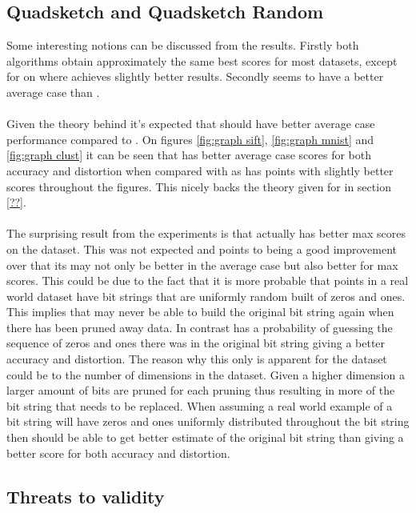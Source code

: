 \subsection{Quadsketch and Quadsketch Random}
Some interesting notions can be discussed from the results. Firstly both algorithms obtain approximately the same best scores for most datasets, except for on \mnist{} where \qsr{} achieves slightly better results. 
Secondly \qsr{} seems to have a better average case than \qs{}. 
\\
\\
Given the theory behind \qsr{} it's expected that \qsr{} should have better average case performance compared to \qs{}. On figures \ref{fig:graph sift}, \ref{fig:graph mnist} and \ref{fig:graph clust} it can be seen that \qsr{} has better average case scores for both accuracy and distortion when compared with \qs{} as \qsr{} has points with slightly better scores throughout the figures. This nicely backs the theory given for \qsr{} in section \ref{??}.
\\
\\
The surprising result from the experiments is that \qsr{} actually has better max scores on the \mnist dataset. This was not expected and points to \qsr{} being a good improvement over \qs{} that its may not only be better in the average case but also better for max scores. This could be due to the fact that it is more probable that points in a real world dataset have bit strings that are uniformly random built of zeros and ones. This implies that \qs{} may never be able to build the original bit string again when there has been pruned away data. In contrast \qsr{} has a probability of guessing the sequence of zeros and ones there was in the original bit string giving a better accuracy and distortion. The reason why this only is apparent for the \mnist{} dataset could be to the number of dimensions in the dataset. Given a higher dimension a larger amount of bits are pruned for each pruning thus resulting in more of the bit string that needs to be replaced. When assuming a real world example of a bit string will have zeros and ones uniformly distributed throughout the bit string then \qsr{} should be able to get better estimate of the original bit string than \qs{} giving a better score for both accuracy and distortion. 



\subsection{Threats to validity}


